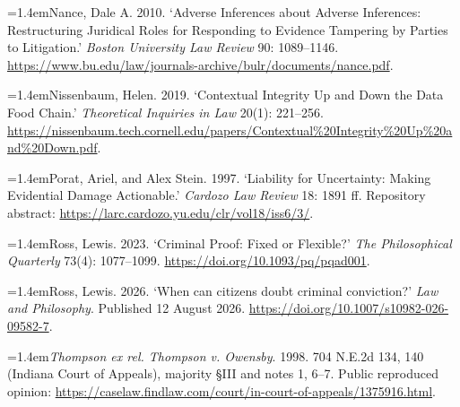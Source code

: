 \hypertarget{ref:nance2010}{}\hangindent=1.4em\noindent Nance, Dale A. 2010. ‘Adverse Inferences about Adverse Inferences: Restructuring Juridical Roles for Responding to Evidence Tampering by Parties to Litigation.’ \emph{Boston University Law Review} 90: 1089–1146. \url{https://www.bu.edu/law/journals-archive/bulr/documents/nance.pdf}.

\hypertarget{ref:nissenbaum2019}{}\hangindent=1.4em\noindent Nissenbaum, Helen. 2019. ‘Contextual Integrity Up and Down the Data Food Chain.’ \emph{Theoretical Inquiries in Law} 20(1): 221–256. \url{https://nissenbaum.tech.cornell.edu/papers/Contextual%20Integrity%20Up%20and%20Down.pdf}.

\hypertarget{ref:porat1997}{}\hangindent=1.4em\noindent Porat, Ariel, and Alex Stein. 1997. ‘Liability for Uncertainty: Making Evidential Damage Actionable.’ \emph{Cardozo Law Review} 18: 1891 ff. Repository abstract: \url{https://larc.cardozo.yu.edu/clr/vol18/iss6/3/}.

\hypertarget{ref:ross2023}{}\hangindent=1.4em\noindent Ross, Lewis. 2023. ‘Criminal Proof: Fixed or Flexible?’ \emph{The Philosophical Quarterly} 73(4): 1077–1099. \url{https://doi.org/10.1093/pq/pqad001}.

\hypertarget{ref:ross2026}{}\hangindent=1.4em\noindent Ross, Lewis. 2026. ‘When can citizens doubt criminal conviction?’ \emph{Law and Philosophy}. Published 12 August 2026. \url{https://doi.org/10.1007/s10982-026-09582-7}.

\hypertarget{ref:thompson1998}{}\hangindent=1.4em\noindent \emph{Thompson ex rel. Thompson v. Owensby}. 1998. 704 N.E.2d 134, 140 (Indiana Court of Appeals), majority §III and notes 1, 6–7. Public reproduced opinion: \url{https://caselaw.findlaw.com/court/in-court-of-appeals/1375916.html}.
\endgroup
